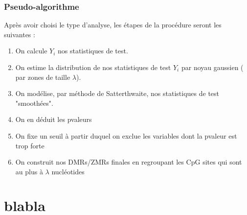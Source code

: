\documentclass{beamer}
\begin{document}
\begin{frame}
\frametitle{Pseudo-algorithme}
Après avoir choisi le type d'analyse, les étapes de la procédure seront les suivantes :
\begin{enumerate}
\item<2-> On calcule $Y_{i}$ nos statistiques de test.
\item<3-> On estime la distribution de nos statistiques de test $Y_{i}$ par noyau gaussien ( par zones de taille $\lambda$).
\item<4-> On modélise, par méthode de Satterthwaite, nos statistiques de test "smoothées".
\item<5-> On en déduit les pvaleurs
\item<6-> On fixe un seuil à partir duquel on exclue les variables dont la pvaleur est trop forte
\item<7-> On construit nos DMRs/ZMRs finales en regroupant les CpG sites qui sont au plus à $\lambda$ nucléotides
\end{enumerate}
\end{frame}










\section{blabla}

\begin{frame}
\end{frame}
\end{document}

